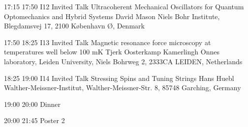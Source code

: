  

\begin{talk}
{17:15}
{17:50}
{I12}
{Invited Talk}
{Ultracoherent Mechanical Oscillators for Quantum Optomechanics and Hybrid Systems}
{David Mason}
{Niels Bohr Institute, Blegdamsvej 17, 2100 København Ø, Denmark}
\end{talk}

\begin{talk}
{17:50}
{18:25}
{I13}
{Invited Talk}
{Magnetic resonance force microscopy at temperatures well below 100 mK}
{Tjerk Oosterkamp}
{Kamerlingh Onnes laboratory, Leiden University, Niels Bohrweg 2, 2333CA LEIDEN, Netherlands}
\end{talk}

\begin{talk}
{18:25}
{19:00}
{I14}
{Invited Talk}
{Stressing Spins and Tuning Strings}
{Hans Huebl}
{Walther-Meissner-Institut, Walther-Meissner-Str. 8, 85748 Garching, Germany}
\end{talk}

\begin{confbreak}
{19:00}
{20:00}
{Dinner}
\end{confbreak}

\begin{confbreak}
{20:00}
{21:45}
{Poster 2}
\end{confbreak}

